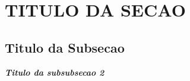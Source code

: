 \section{TITULO DA SECAO}\label{sec:conteudo2}
\blindtext
\subsection{Titulo da Subsecao}\label{subsec:conteudo2}
\blindtext

\noindent\textbf{\textit{Titulo da subsubsecao 2}}

\blindtext